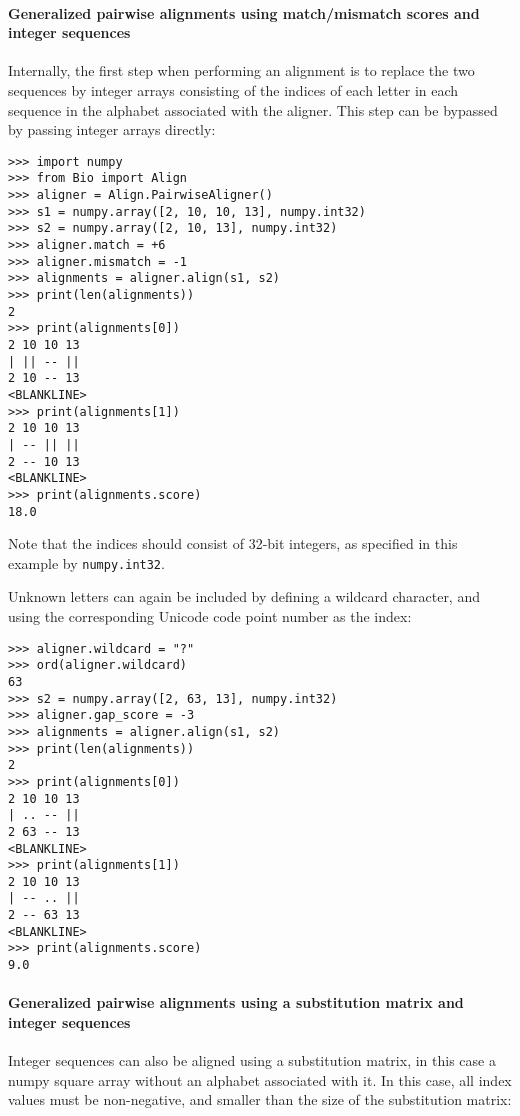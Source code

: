 \paragraph*{Generalized pairwise alignments using match/mismatch scores and integer sequences}

Internally, the first step when performing an alignment is to replace the two sequences by integer arrays consisting of the indices of each letter in each sequence in the alphabet associated with the aligner. This step can be bypassed by passing integer arrays directly:

\begin{verbatim}
>>> import numpy
>>> from Bio import Align
>>> aligner = Align.PairwiseAligner()
>>> s1 = numpy.array([2, 10, 10, 13], numpy.int32)
>>> s2 = numpy.array([2, 10, 13], numpy.int32)
>>> aligner.match = +6
>>> aligner.mismatch = -1
>>> alignments = aligner.align(s1, s2)
>>> print(len(alignments))
2
>>> print(alignments[0])
2 10 10 13
| || -- ||
2 10 -- 13
<BLANKLINE>
>>> print(alignments[1])
2 10 10 13
| -- || ||
2 -- 10 13
<BLANKLINE>
>>> print(alignments.score)
18.0
\end{verbatim}
Note that the indices should consist of 32-bit integers, as specified in this example by \verb+numpy.int32+.

Unknown letters can again be included by defining a wildcard character, and using the corresponding Unicode code point number as the index:

\begin{verbatim}
>>> aligner.wildcard = "?"
>>> ord(aligner.wildcard)
63
>>> s2 = numpy.array([2, 63, 13], numpy.int32)
>>> aligner.gap_score = -3
>>> alignments = aligner.align(s1, s2)
>>> print(len(alignments))
2
>>> print(alignments[0])
2 10 10 13
| .. -- ||
2 63 -- 13
<BLANKLINE>
>>> print(alignments[1])
2 10 10 13
| -- .. ||
2 -- 63 13
<BLANKLINE>
>>> print(alignments.score)
9.0
\end{verbatim}

\paragraph*{Generalized pairwise alignments using a substitution matrix and integer sequences}

Integer sequences can also be aligned using a substitution matrix, in this case a numpy square array without an alphabet associated with it. In this case, all index values must be non-negative, and smaller than the size of the substitution matrix:

